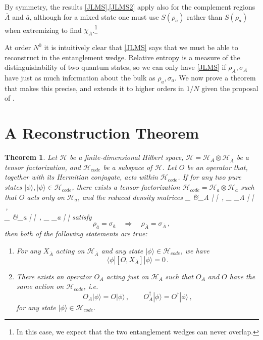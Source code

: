\documentclass[aps,prl,twocolumn,nofootinbib,longbibliography,superscriptaddress]{revtex4-1}
\newcommand{\be}{\begin{equation}}
\newcommand{\ee}{\end{equation}}
\newcommand{\Ab}{\overline{A}}
\newcommand{\ab}{\overline{a}}
\newcommand{\HA}{\mathcal{H}_A}
\newcommand{\HAb}{\mathcal{H}_{\overline{A}}}
\newcommand{\Hc}{\mathcal{H}_{code}}
\newcommand{\Ha}{\mathcal{H}_a}
\newcommand{\Hab}{\mathcal{H}_{\overline{a}}}
\newcommand{\mH}{\mathcal{H}}
\newtheorem*{theorem}{Theorem}
\def\ba#1\ea{\begin{align}#1\end{align}}
\def\p{\phi}
\def\r{\rho}
\def\s{\sigma}
\def\y{\psi}
\def\la{\label}
\def\eq{\equiv}
\def\qu{\quad}
\def\qqu{\qquad}
\def\<{\langle}
\def\>{\rangle}
\def\Tr{{\rm Tr}}
\begin{document}
By symmetry, the results \eqref{JLMS},\eqref{JLMS2} apply also for the complement regions $\Ab$ and $\ab$, although for a mixed state one must use $S(\rho_{\ab})$ rather than $S(\rho_{a})$ when extremizing to find $\chi_{\Ab}$.\footnote{In this case, we expect that the two entanglement wedges can never overlap.}

At order $N^0$ it is intuitively clear that \eqref{JLMS} says that we must be able to reconstruct in the entanglement wedge.  Relative entropy is a measure of the distinguishability of two quantum states, so we can only have \eqref{JLMS} if $\rho_A,\sigma_A$ have just as much information about the bulk as $\rho_a,\sigma_a$.  We now prove a theorem that makes this precise, and extends it to higher orders in $1/N$ given the proposal of \cite{Engelhardt:2014gca}.

\section{A Reconstruction Theorem}
\begin{theorem}
Let $\mH$ be a finite-dimensional Hilbert space, $\mH = \HA \otimes \HAb$ be a tensor factorization, and $\Hc$ be a subspace of $\mH$.  Let $O$ be an operator that, together with its Hermitian conjugate, acts within $\Hc$.  If for any two pure states $|\p\>, |\y\> \in \Hc$, there exists a tensor factorization $\Hc = \Ha \otimes \Hab$ such that $O$ acts only on $\Ha$, and the reduced density matrices
\ba\la{rdm}\nonumber
\r_{\Ab} &\eq \Tr_A |\p\> \<\p| \,,\qqu
\s_{\Ab} \eq \Tr_A |\y\> \<\y| \,,\\
\r_{\ab} &\eq \Tr_a |\p\> \<\p| \,,\qqu
\s_{\ab} \eq \Tr_a |\y\> \<\y|
\ea
satisfy
\be\la{cond}
\rho_{\ab}=\sigma_{\ab} \qu\Rightarrow\qu \rho_{\Ab}=\sigma_{\Ab} \,,
\ee
then both of the following statements are true:
\begin{enumerate}
\item For any $X_{\Ab}$ acting on $\HAb$ and any state $|\p\> \in \Hc$, we have
\be\la{zcomm}
\<\p| [O, X_{\Ab}] |\p\> =0 \,.
\ee
\item There exists an operator $O_A$ acting just on $\HA$ such that $O_A$ and $O$ have the same action on $\Hc$, i.e.
\be\la{idact}
O_A |\p\> = O |\p\> \,,\qqu
O_A^\dag |\p\> = O^\dag |\p\> \,,
\ee
for any state $|\p\> \in \Hc$.
\end{enumerate}
\end{theorem}
\end{document}
